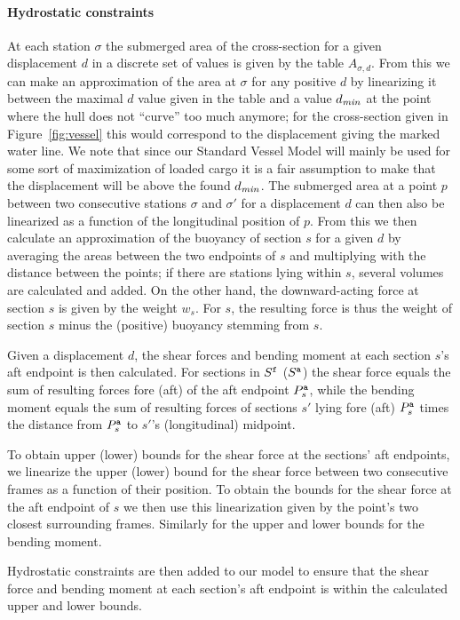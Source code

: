 \paragraph{Hydrostatic constraints}
At each station $\sigma$ the submerged area of the cross-section for a given displacement $d$ in a discrete set of values is given by the table $A_{\sigma,d}$. From this we can make an approximation of the area at $\sigma$ for any positive $d$ by linearizing it between the maximal $d$ value given in the table and a value $d_\mathit{min}$ at the point where the hull does not ``curve'' too much anymore; for the cross-section given in Figure~\ref{fig:vessel} this would correspond to the displacement giving the marked water line.
We note that since our Standard Vessel Model will mainly be used for some sort of maximization of loaded cargo it is a fair assumption to make that the displacement will be above the found $d_\mathit{min}$.  
The submerged area at a point $p$ between two consecutive stations $\sigma$ and $\sigma'$ for a displacement $d$ can then also be linearized as a function of the longitudinal position of $p$. 
From this we then calculate an approximation of the buoyancy of section $s$ for a given $d$ by averaging the areas between the two endpoints of $s$ and multiplying with the distance between the points; if there are stations lying within $s$, several volumes are calculated and added.
On the other hand, the downward-acting force at section $s$ is given by the weight $w_s$. For $s$, the resulting force is thus the weight of section $s$ minus the (positive) buoyancy stemming from $s$.  
  
Given a displacement $d$, the shear forces and bending moment at each section $s$'s aft endpoint is then calculated. For sections in $S^{\texttt{f}}$ ($S^{\texttt{a}}$) the shear force  equals the sum of resulting forces fore (aft) of the aft endpoint $P^{\texttt{a}}_s$, while the bending moment equals the sum of resulting forces of sections $s'$ lying fore (aft) $P^{\texttt{a}}_s$ times the distance from $P^{\texttt{a}}_s$ to $s'$'s (longitudinal) midpoint.

To obtain upper (lower) bounds for the shear force at the sections' aft endpoints,  
we linearize the upper (lower) bound for the shear force between two consecutive frames as a function of their position. To obtain the bounds for the shear force at the aft endpoint of $s$ we then use this linearization given by the point's two closest surrounding frames. Similarly for the upper and lower bounds for the bending moment.

Hydrostatic constraints are then added to our model to ensure that the shear force and bending moment at each section's aft endpoint is within the calculated upper and lower bounds.


